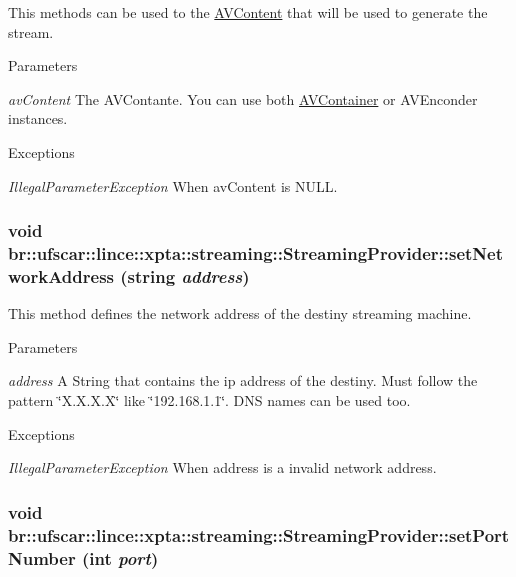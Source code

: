 This methods can be used to the \hyperlink{classbr_1_1ufscar_1_1lince_1_1xpta_1_1streaming_1_1AVContent}{AVContent} that will be used to generate the stream. 


\begin{DoxyParams}{Parameters}
\item[{\em avContent}]The AVContante. You can use both \hyperlink{classbr_1_1ufscar_1_1lince_1_1xpta_1_1streaming_1_1AVContainer}{AVContainer} or AVEnconder instances. \end{DoxyParams}

\begin{DoxyExceptions}{Exceptions}
\item[{\em IllegalParameterException}]When avContent is NULL. \end{DoxyExceptions}
\hypertarget{classbr_1_1ufscar_1_1lince_1_1xpta_1_1streaming_1_1StreamingProvider_a2d1a5f1906bd18a9a307d138982c5426}{
\subsubsection[{setNetworkAddress}]{\setlength{\rightskip}{0pt plus 5cm}void br::ufscar::lince::xpta::streaming::StreamingProvider::setNetworkAddress (string {\em address})}}
\label{classbr_1_1ufscar_1_1lince_1_1xpta_1_1streaming_1_1StreamingProvider_a2d1a5f1906bd18a9a307d138982c5426}


This method defines the network address of the destiny streaming machine. 


\begin{DoxyParams}{Parameters}
\item[{\em address}]A String that contains the ip address of the destiny. Must follow the pattern \char`\"{}X.X.X.X\char`\"{} like \char`\"{}192.168.1.1\char`\"{}. DNS names can be used too. \end{DoxyParams}

\begin{DoxyExceptions}{Exceptions}
\item[{\em IllegalParameterException}]When address is a invalid network address. \end{DoxyExceptions}
\hypertarget{classbr_1_1ufscar_1_1lince_1_1xpta_1_1streaming_1_1StreamingProvider_a2ff06395159cbe67ff5431e9c81df31e}{
\subsubsection[{setPortNumber}]{\setlength{\rightskip}{0pt plus 5cm}void br::ufscar::lince::xpta::streaming::StreamingProvider::setPortNumber (int {\em port})}}
\label{classbr_1_1ufscar_1_1lince_1_1xpta_1_1streaming_1_1StreamingProvider_a2ff06395159cbe67ff5431e9c81df31e}


